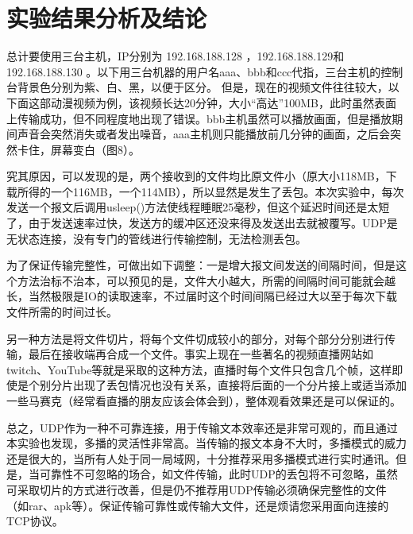 \documentclass[UTF8]{ctexart}
\begin{document}
\section{实验结果分析及结论}
总计要使用三台主机，IP分别为 192.168.188.128 ，192.168.188.129和192.168.188.130 。以下用三台机器的用户名aaa、bbb和ccc代指，三台主机的控制台背景色分别为紫、白、黑，以便于区分。
但是，现在的视频文件往往较大，以下面这部动漫视频为例，该视频长达20分钟，大小“高达”100MB，此时虽然表面上传输成功，但不同程度地出现了错误。bbb主机虽然可以播放画面，但是播放期间声音会突然消失或者发出噪音，aaa主机则只能播放前几分钟的画面，之后会突然卡住，屏幕变白（图8）。
\par
究其原因，可以发现的是，两个接收到的文件均比原文件小（原大小118MB，下载所得的一个116MB，一个114MB），所以显然是发生了丢包。本次实验中，每次发送一个报文后调用usleep()方法使线程睡眠25毫秒，但这个延迟时间还是太短了，由于发送速率过快，发送方的缓冲区还没来得及发送出去就被覆写。UDP是无状态连接，没有专门的管线进行传输控制，无法检测丢包。
\par
为了保证传输完整性，可做出如下调整：一是增大报文间发送的间隔时间，但是这个方法治标不治本，可以预见的是，文件大小越大，所需的间隔时间可能就会越长，当然极限是IO的读取速率，不过届时这个时间间隔已经过大以至于每次下载文件所需的时间过长。
\par
另一种方法是将文件切片，将每个文件切成较小的部分，对每个部分分别进行传输，最后在接收端再合成一个文件。事实上现在一些著名的视频直播网站如twitch、YouTube等就是采取的这种方法，直播时每个文件只包含几个帧，这样即使是个别分片出现了丢包情况也没有关系，直接将后面的一个分片接上或适当添加一些马赛克（经常看直播的朋友应该会体会到），整体观看效果还是可以保证的。
\par
总之，UDP作为一种不可靠连接，用于传输文本效率还是非常可观的，而且通过本实验也发现，多播的灵活性非常高。当传输的报文本身不大时，多播模式的威力还是很大的，当所有人处于同一局域网，十分推荐采用多播模式进行实时通讯。但是，当可靠性不可忽略的场合，如文件传输，此时UDP的丢包将不可忽略，虽然可采取切片的方式进行改善，但是仍不推荐用UDP传输必须确保完整性的文件（如rar、apk等）。保证传输可靠性或传输大文件，还是烦请您采用面向连接的TCP协议。


\end{document}
